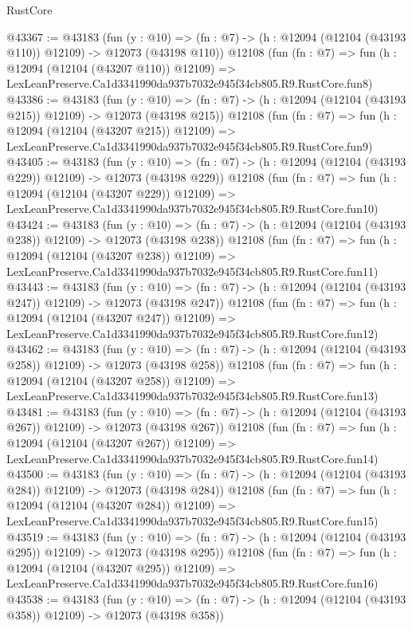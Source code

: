 \begin{lexlean}{RustCore}
\begin{coremodule}
@43367 := @43183
    (fun (y : @10) =>
    (fn : @7) -> (h : @12094 (@12104 (@43193 @110)) @12109) -> @12073 (@43198 @110))
    @12108
    (fun (fn : @7) =>
    fun (h : @12094 (@12104 (@43207 @110)) @12109) =>
    LexLeanPreserve.Ca1d3341990da937b7032e945f34cb805.R9.RustCore.fun8)
@43386 := @43183
    (fun (y : @10) =>
    (fn : @7) -> (h : @12094 (@12104 (@43193 @215)) @12109) -> @12073 (@43198 @215))
    @12108
    (fun (fn : @7) =>
    fun (h : @12094 (@12104 (@43207 @215)) @12109) =>
    LexLeanPreserve.Ca1d3341990da937b7032e945f34cb805.R9.RustCore.fun9)
@43405 := @43183
    (fun (y : @10) =>
    (fn : @7) -> (h : @12094 (@12104 (@43193 @229)) @12109) -> @12073 (@43198 @229))
    @12108
    (fun (fn : @7) =>
    fun (h : @12094 (@12104 (@43207 @229)) @12109) =>
    LexLeanPreserve.Ca1d3341990da937b7032e945f34cb805.R9.RustCore.fun10)
@43424 := @43183
    (fun (y : @10) =>
    (fn : @7) -> (h : @12094 (@12104 (@43193 @238)) @12109) -> @12073 (@43198 @238))
    @12108
    (fun (fn : @7) =>
    fun (h : @12094 (@12104 (@43207 @238)) @12109) =>
    LexLeanPreserve.Ca1d3341990da937b7032e945f34cb805.R9.RustCore.fun11)
@43443 := @43183
    (fun (y : @10) =>
    (fn : @7) -> (h : @12094 (@12104 (@43193 @247)) @12109) -> @12073 (@43198 @247))
    @12108
    (fun (fn : @7) =>
    fun (h : @12094 (@12104 (@43207 @247)) @12109) =>
    LexLeanPreserve.Ca1d3341990da937b7032e945f34cb805.R9.RustCore.fun12)
@43462 := @43183
    (fun (y : @10) =>
    (fn : @7) -> (h : @12094 (@12104 (@43193 @258)) @12109) -> @12073 (@43198 @258))
    @12108
    (fun (fn : @7) =>
    fun (h : @12094 (@12104 (@43207 @258)) @12109) =>
    LexLeanPreserve.Ca1d3341990da937b7032e945f34cb805.R9.RustCore.fun13)
@43481 := @43183
    (fun (y : @10) =>
    (fn : @7) -> (h : @12094 (@12104 (@43193 @267)) @12109) -> @12073 (@43198 @267))
    @12108
    (fun (fn : @7) =>
    fun (h : @12094 (@12104 (@43207 @267)) @12109) =>
    LexLeanPreserve.Ca1d3341990da937b7032e945f34cb805.R9.RustCore.fun14)
@43500 := @43183
    (fun (y : @10) =>
    (fn : @7) -> (h : @12094 (@12104 (@43193 @284)) @12109) -> @12073 (@43198 @284))
    @12108
    (fun (fn : @7) =>
    fun (h : @12094 (@12104 (@43207 @284)) @12109) =>
    LexLeanPreserve.Ca1d3341990da937b7032e945f34cb805.R9.RustCore.fun15)
@43519 := @43183
    (fun (y : @10) =>
    (fn : @7) -> (h : @12094 (@12104 (@43193 @295)) @12109) -> @12073 (@43198 @295))
    @12108
    (fun (fn : @7) =>
    fun (h : @12094 (@12104 (@43207 @295)) @12109) =>
    LexLeanPreserve.Ca1d3341990da937b7032e945f34cb805.R9.RustCore.fun16)
@43538 := @43183
    (fun (y : @10) =>
    (fn : @7) -> (h : @12094 (@12104 (@43193 @358)) @12109) -> @12073 (@43198 @358))

\end{coremodule}
\end{lexlean}
